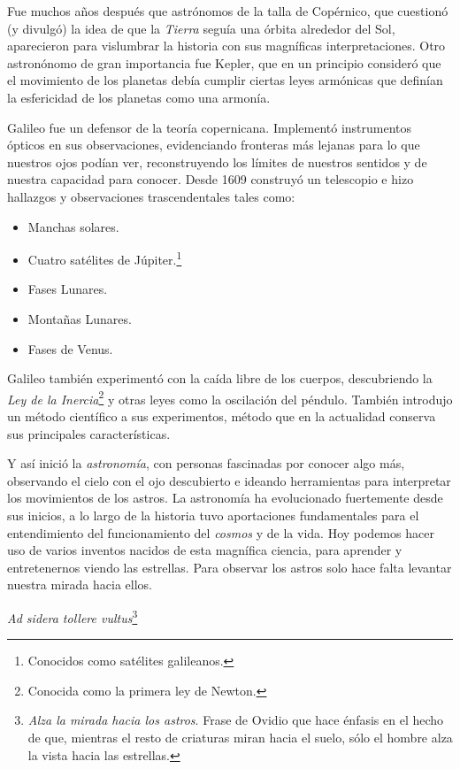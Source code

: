 \documentclass[12pt,a4paper]{article}
\begin{document}
\medskip 

Fue muchos a\~nos despu\'es que astr\'onomos de la talla de Cop\'ernico, que cuestion\'o (y divulg\'o) la idea de que la \textit{Tierra} segu\'ia una \'orbita alrededor del Sol, aparecieron para vislumbrar la historia con sus magn\'ificas interpretaciones. Otro astron\'onomo de gran importancia fue Kepler, que en un principio consider\'o que el movimiento de los planetas deb\'ia cumplir ciertas leyes arm\'onicas que defin\'ian la esfericidad de los planetas como una armon\'ia.

\medskip 

Galileo fue un defensor de la teor\'ia copernicana. Implement\'o instrumentos \'opticos en sus observaciones, evidenciando fronteras m\'as lejanas para lo que nuestros ojos pod\'ian ver, reconstruyendo los l\'imites de nuestros sentidos y de nuestra capacidad para conocer. Desde 1609 construy\'o un telescopio e hizo hallazgos y observaciones trascendentales tales como:

\begin{itemize}
	\item Manchas solares.
	\item Cuatro sat\'elites de J\'upiter.\footnote{Conocidos como sat\'elites galileanos.}
	\item Fases Lunares.
	\item Monta\~nas Lunares.
	\item Fases de Venus.
\end{itemize}

Galileo tambi\'en experiment\'o con la ca\'ida libre de los cuerpos, descubriendo la \textit{Ley de la Inercia}\footnote{Conocida como la primera ley de Newton.} y otras leyes como la oscilaci\'on del p\'endulo. Tambi\'en introdujo un m\'etodo cient\'ifico a sus experimentos, m\'etodo que en la actualidad conserva sus principales caracter\'isticas.

\medskip 

 Y as\'i inici\'o la \textit{astronom\'ia}, con personas fascinadas por conocer algo m\'as, observando el cielo con el ojo descubierto e ideando herramientas para interpretar los movimientos de los astros. La astronom\'ia ha evolucionado fuertemente desde sus inicios, a lo largo de la historia tuvo aportaciones fundamentales para el entendimiento del funcionamiento del \textit{cosmos} y de la vida. Hoy podemos hacer uso de varios inventos nacidos de esta magn\'ifica ciencia, para aprender y entretenernos viendo las estrellas. Para observar los astros solo hace falta levantar nuestra mirada hacia ellos.

\begin{flushright}

\textit{Ad sidera tollere vultus}\footnote{\textit{Alza la mirada hacia los astros}. Frase de Ovidio  que hace \'enfasis en el hecho de que, mientras el resto de criaturas miran hacia el suelo, s\'olo el hombre alza la vista hacia las estrellas.}

\end{flushright}
\end{document}
